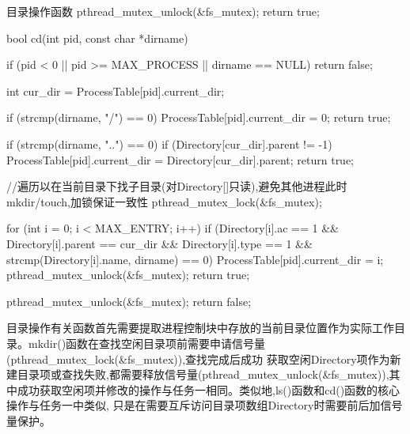 \begin{ccode}{目录操作函数}
{    pthread_mutex_unlock(&fs_mutex);
    return true;
}

bool cd(int pid, const char *dirname)
{
    if (pid < 0 || pid >= MAX_PROCESS || dirname == NULL) return false;

    int cur_dir = ProcessTable[pid].current_dir;

    if (strcmp(dirname, "/") == 0) {
        ProcessTable[pid].current_dir = 0;
        return true;
    }

    if (strcmp(dirname, "..") == 0) {
        if (Directory[cur_dir].parent != -1) {
            ProcessTable[pid].current_dir = Directory[cur_dir].parent;
        }
        return true;
    }

    //遍历以在当前目录下找子目录(对Directory[]只读),避免其他进程此时mkdir/touch,加锁保证一致性
    pthread_mutex_lock(&fs_mutex);

    for (int i = 0; i < MAX_ENTRY; i++) {
        if (Directory[i].ac == 1 &&
            Directory[i].parent == cur_dir &&
            Directory[i].type == 1 &&
            strcmp(Directory[i].name, dirname) == 0) {
            ProcessTable[pid].current_dir = i;
            pthread_mutex_unlock(&fs_mutex);
            return true;
        }
    }

    pthread_mutex_unlock(&fs_mutex);
    return false;
}
\end{ccode}
目录操作有关函数首先需要提取进程控制块中存放的当前目录位置作为实际工作目录。mkdir()函数在查找空闲目录项前需要申请信号量(pthread\_mutex\_lock(\&fs\_mutex)),查找完成后成功
获取空闲Directory项作为新建目录项或查找失败,都需要释放信号量(pthread\_mutex\_unlock(\&fs\_mutex)),其中成功获取空闲项并修改的操作与任务一相同。类似地,ls()函数和cd()函数的核心操作与任务一中类似,
只是在需要互斥访问目录项数组Directory时需要前后加信号量保护。